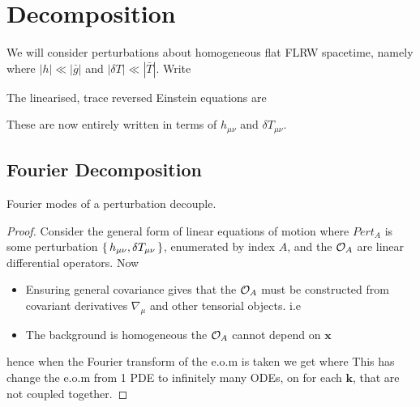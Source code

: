 \documentclass{article}
\begin{document}
\section{Decomposition}
We will consider perturbations about homogeneous flat FLRW spacetime, namely 
where $|h| \ll |\bar{g}|$ and $|\delta T| \ll |\bar{T}|$. Write 

\begin{theorem}
The linearised, trace reversed Einstein equations are 
\end{theorem}

These are now entirely written in terms of $h_{\mu\nu}$ and $\delta T_{\mu\nu}$. 
\subsection{Fourier Decomposition}

\begin{prop}
Fourier modes of a perturbation decouple. 
\end{prop}
\begin{proof}
Consider the general form of linear equations of motion
where $Pert_A$ is some perturbation $\set{h_{\mu\nu},\delta T_{\mu\nu}}$, enumerated by index $A$, and the $\mathcal{O}_A$ are linear differential operators.
Now 
\begin{itemize}
    \item Ensuring general covariance gives that the $\mathcal{O}_A$ must be constructed from covariant derivatives $\nabla_\mu$ and other tensorial objects. i.e 
    \item The background is homogeneous the $\mathcal{O}_A$ cannot depend on $\bm{x}$
\end{itemize}
hence when the Fourier transform of the e.o.m is taken we get 
where 
This has change the e.o.m from 1 PDE to infinitely many ODEs, on for each $\bm{k}$, that are not coupled together. 
\end{proof}
\end{document}
